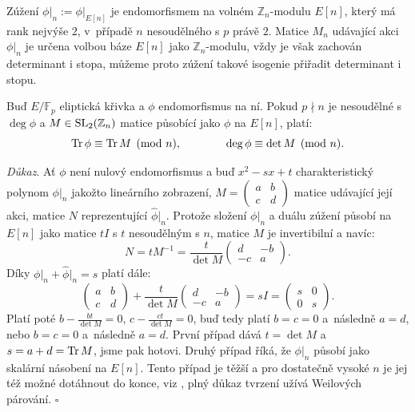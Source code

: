 \documentclass[12pt]{report}
\begin{document}
Zúžení $\phi \vert_n := \phi \vert_{E[n]}$ je endomorfismem na volném $\mathbb{Z}_n$-modulu $E[n]$, který má rank nejvýše $2$, v~případě $n$ nesoudělného s $p$ právě $2$. Matice $M_n$ udávající akci $\phi \vert_n$ je určena volbou báze $E[n]$ jako $\mathbb{Z}_n$-modulu, vždy je však zachován determinant i stopa, můžeme proto zúžení takové isogenie přiřadit determinant i stopu.
\begin{veta}
Buď $E/\mathbb{F}_p$ eliptická křivka a $\phi$ endomorfismus na ní. Pokud $p \nmid n$ je nesoudělné s $\deg \phi$ a $M \in \operatorname{SL}_2 (\mathbb{Z}_n)$ matice působící jako $\phi$ na $E[n]$, platí:
\begin{equation*}
\operatorname{Tr} \phi \equiv \operatorname{Tr} M \pmod{n}, \qquad \qquad \deg \phi \equiv \det M \pmod{n}.
\end{equation*}
\end{veta}
\noindent \textit{Důkaz}. Ať $\phi$ není nulový endomorfismus a buď $x^2 - sx + t$ charakteristický polynom $\phi \vert_n$ jakožto lineárního zobrazení, $M = \begin{pmatrix} a & b\\ c & d \end{pmatrix}$ matice udávající její akci, matice $N$ reprezentující $\widehat{\phi} \vert_n$. Protože složení $\phi \vert_n$ a duálu zúžení působí na $E[n]$ jako matice $t I$ s $t$ nesoudělným s $n$, matice $M$ je invertibilní a navíc:
\begin{equation*}
N = t M^{-1} = \frac{t}{\det M} \begin{pmatrix} d & -b\\ -c & a \end{pmatrix}.
\end{equation*} 
Díky $\phi \vert_n + \widehat{\phi} \vert_n = s$ platí dále:
\begin{equation*}
\begin{pmatrix} a & b\\ c & d \end{pmatrix} + \frac{t}{\det M} \begin{pmatrix} d & -b\\ -c & a \end{pmatrix} = sI = \begin{pmatrix} s & 0\\ 0 & s \end{pmatrix}.
\end{equation*}
Platí poté $b - \frac{b t}{\det M} = 0$, $c - \frac{c t}{\det M} = 0$, buď tedy platí $b=c=0$ a~následně $a=d$, nebo $b=c=0$ a~následně $a=d$. První případ dává $t = \det M$ a $s = a+d = \operatorname{Tr} M$, jsme pak hotovi. Druhý případ říká, že $\phi \vert _n$ působí jako skalární násobení na $E[n]$. Tento případ je těžší a pro dostatečně vysoké $n$ je jej též možné dotáhnout do konce, viz \cite[Thm. 7.17]{Sutherland}, plný důkaz tvrzení užívá Weilových párování. \hfill $\square$\\ 
\end{document}
